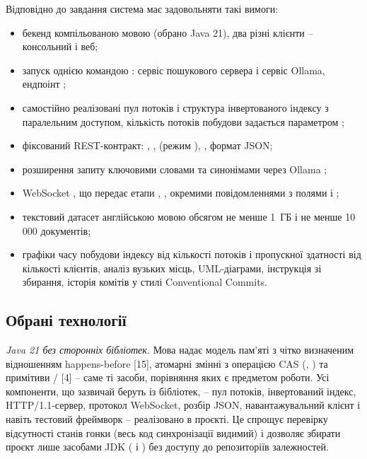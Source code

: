 Відповідно до завдання система має задовольняти такі вимоги:
\begin{itemize}
\item бекенд компільованою мовою (обрано Java 21), два різні клієнти -- консольний і веб;
\item запуск однією командою : сервіс пошукового сервера і сервіс
Ollama, ендпоінт ;
\item самостійно реалізовані пул потоків і структура інвертованого індексу з паралельним
доступом, кількість потоків побудови задається параметром ;
\item фіксований REST-контракт: , ,
 (режим ), , формат JSON;
\item розширення запиту ключовими словами та синонімами через Ollama ;
\item WebSocket , що передає етапи ,
,  окремими повідомленнями з полями  і
;
\item текстовий датасет англійською мовою обсягом не менше 1~ГБ і не менше 10\,000 документів;
\item графіки часу побудови індексу від кількості потоків і пропускної здатності від
кількості клієнтів, аналіз вузьких місць, UML-діаграми, інструкція зі збирання, історія
комітів у стилі Conventional Commits.
\end{itemize}

\subsection*{Обрані технології}

\textit{Java 21 без сторонніх бібліотек.} Мова надає модель пам'яті з чітко визначеним
відношенням happens-before [15], атомарні змінні з операцією CAS (,
) та примітиви / [4] -- саме ті засоби,
порівняння яких є предметом роботи. Усі компоненти, що зазвичай беруть із бібліотек, --
пул потоків, інвертований індекс, HTTP/1.1-сервер, протокол WebSocket, розбір JSON,
навантажувальний клієнт і навіть тестовий фреймворк -- реалізовано в проєкті. Це
спрощує перевірку відсутності станів гонки (весь код синхронізації видимий) і дозволяє
збирати проєкт лише засобами JDK ( і ) без доступу до репозиторіїв
залежностей.

